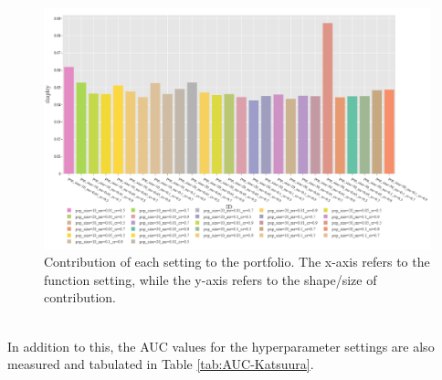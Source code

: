 \documentclass{article}
\begin{document}
\begin{figure}[h!]
    \centering
    \includegraphics[width=0.9\linewidth]{Graphs/Katsuura/Shapley_Values.png}
    \caption{Contribution of each setting to the portfolio. The x-axis refers to the function setting, while the y-axis refers to the shape/size of contribution. }
    \label{fig:shapley-katsuura}
\end{figure}\\In addition to this, the AUC values for the hyperparameter settings are also measured and tabulated in Table \ref{tab:AUC-Katsuura}.
\end{document}
